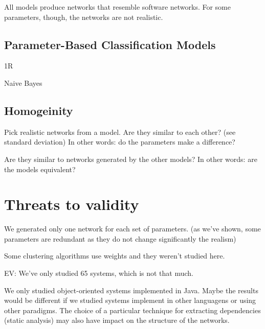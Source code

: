 All models produce networks that resemble software networks.  For some
parameters, though, the networks are not realistic.

\subsection{Parameter-Based Classification Models}

1R

Naive Bayes

\subsection{Homogeinity}

Pick realistic networks from a model. Are they similar to each other? (see
standard deviation) In other words: do the parameters make a difference?

Are they similar to networks generated by the other models? In other words: are
the models equivalent?

\section{Threats to validity}


%

We generated only one network for each set of parameters. (as we've shown, some
parameters are redundant as they do not change significantly the realism)

Some clustering algorithms use weights and they weren't studied here.

EV: We've only studied 65 systems, which is not that much.

We only studied object-oriented systems implemented in Java. Maybe the results
would be different if we studied systems implement in other languagens or using
other paradigms. The choice of a particular technique for extracting
dependencies (static analysis) may also have impact on the structure of the
networks.


